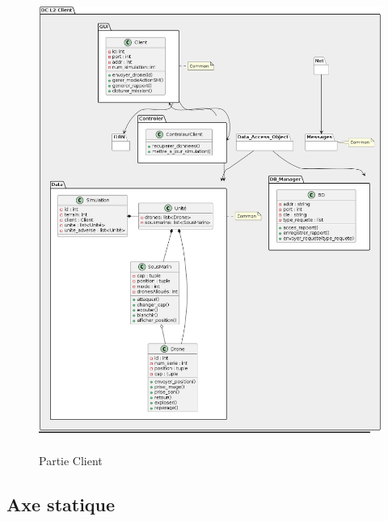 \begin{figure}[H]
	\centering
	\includegraphics[height=15cm]{img/DC_L2_Client.png} 
	\caption{Partie Client}
\end{figure}



\subsection{Axe statique}
